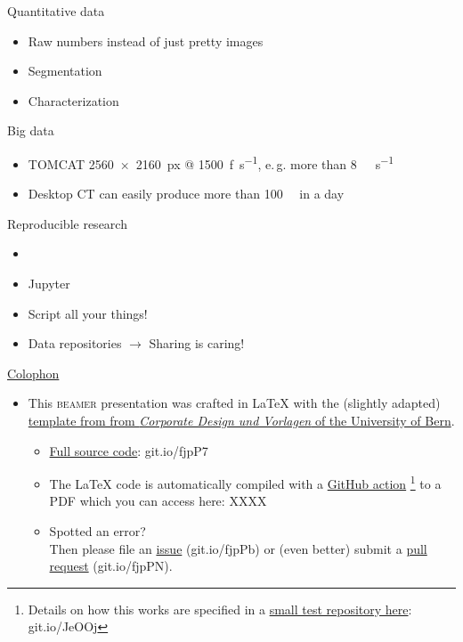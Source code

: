 \documentclass[aspectratio=169,10pt,draft]{beamer}
\newcommand{\eg}{e.\,g.\xspace}
\newcommand{\uct}{\si{\micro}CT\xspace}%
\begin{document}
\begin{frame}{Quantitative data}
	\begin{itemize}
		\item Raw numbers instead of just pretty images
		\item Segmentation
		\item Characterization
	\end{itemize}
\end{frame}

\begin{frame}{Big data}
	\begin{itemize}
		\item TOMCAT \SI{2560x2160}{px} @ \SI{1500}{f\per\second}, \eg more than \SI{8}{\giga\byte\per\second}
		\item Desktop \uct can easily produce more than \SI{100}{\giga\byte} in a day
	\end{itemize}
\end{frame}

\begin{frame}{Reproducible research}
	\begin{itemize}
		\item \faGit
		\item Jupyter
		\item Script all your things!
		\item Data repositories \(\rightarrow\) Sharing is caring!
	\end{itemize}
\end{frame}

\begin{frame}{\href{https://en.wikipedia.org/wiki/Colophon_(publishing)}{Colophon}}
	\begin{itemize} 
		\item This \textsc{beamer} presentation was crafted in \LaTeX\xspace with the (slightly adapted) \href{http://intern.unibe.ch/dienstleistungen/corporate_design_und_vorlagen/praesentationen/index_ger.html}{template from from \emph{Corporate Design und Vorlagen} of the University of Bern}.
		\begin{itemize}
			\item \href{https://github.com/habi/lecture.microtomography/}{Full source code}: git.io/fjpP7
			\item The \LaTeX\xspace code is automatically compiled with a \href{https://github.com/actions}{GitHub action}%
				\footnote{Details on how this works are specified in a \href{https://github.com/habi/latex-test/}{small test repository here}: git.io/JeOOj} %
				to a PDF which you can access here: XXXX
			\item Spotted an error?\\%
				Then please file an \href{https://github.com/habi/lecture.microtomography/issues}{issue} (git.io/fjpPb) or (even better) submit a \href{https://github.com/habi/lecture.microtomography/pulls}{pull request} (git.io/fjpPN).
		\end{itemize}
	\end{itemize}
\end{frame}
\end{document}
